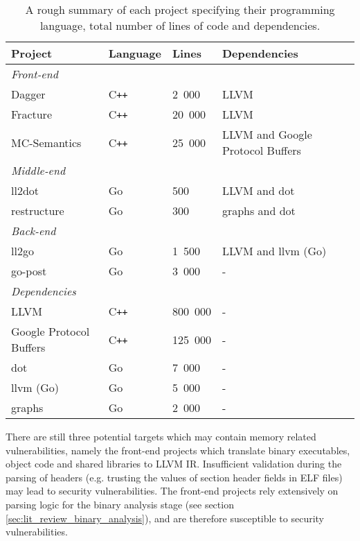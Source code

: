 \begin{table}[htbp]
	\begin{center}
		\begin{tabular}{|l|l|l|l|}
			\hline
			\textbf{Project} & \textbf{Language} & \textbf{Lines} & \textbf{Dependencies} \\
			\hline
			\multicolumn{4}{|l|}{\hspace{4ex} \textit{Front-end}} \\
			\hline
			Dagger & C\texttt{++} & 2~000 & LLVM \\
			Fracture & C\texttt{++} & 20~000 & LLVM \\
			MC-Semantics & C\texttt{++} & 25~000 & LLVM and Google Protocol Buffers \\
			\hline
			\multicolumn{4}{|l|}{\hspace{4ex} \textit{Middle-end}} \\
			\hline
			ll2dot & Go & 500 & LLVM and dot \\
			restructure & Go & 300 & graphs and dot \\
			\hline
			\multicolumn{4}{|l|}{\hspace{4ex} \textit{Back-end}} \\
			\hline
			ll2go & Go & 1~500 & LLVM and llvm (Go) \\
			go-post & Go & 3~000 & - \\
			\hline
			\multicolumn{4}{|l|}{\hspace{4ex} \textit{Dependencies}} \\
			\hline
			LLVM & C\texttt{++} & 800~000 & - \\
			Google Protocol Buffers & C\texttt{++} & 125~000 & - \\
			dot & Go & 7~000 & - \\
			llvm (Go) & Go & 5~000 & - \\
			graphs & Go & 2~000 & - \\
			\hline
		\end{tabular}
	\end{center}
	\caption{A rough summary of each project specifying their programming language, total number of lines of code and dependencies.}
	\label{tbl:loc_summary}
\end{table}

There are still three potential targets which may contain memory related vulnerabilities, namely the front-end projects which translate binary executables, object code and shared libraries to LLVM IR. Insufficient validation during the parsing of headers (e.g. trusting the values of section header fields in ELF files) may lead to security vulnerabilities. The front-end projects rely extensively on parsing logic for the binary analysis stage (see section \ref{sec:lit_review_binary_analysis}), and are therefore susceptible to security vulnerabilities.

